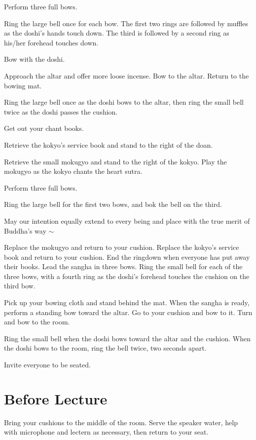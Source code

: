 \documentclass{kdo}
\begin{document}
\begin{services}
\doshi Perform three full bows.

\doan Ring the large bell once for each bow. The first two rings are followed
by muffles as the doshi's hands touch down. The third is followed by a second
ring as his/her forehead touches down.
\firstBows

\sangha Bow with the doshi.

\doshi Approach the altar and offer more loose incense. Bow to the altar.
Return to the bowing mat.

\doan Ring the large bell once as the doshi bows to the altar, then ring the
small bell twice as the doshi passes the cushion.
\takeOutChantBookBells

\sangha Get out your chant books.

\kokyo Retrieve the kokyo's service book and stand to the right of the doan.

\tenken Retrieve the small mokugyo and stand to the right of the kokyo. Play the
mokugyo as the kokyo chants the heart sutra.

\doshi Perform three full bows.

\doan Ring the large bell for the first two bows, and bok the bell on the
third.
\secondBows

\kokyo \heartOfGreatPerfectWisdomSutra

\kokyo May our intention equally extend to every being and place with the true
merit of Buddha's way $\sim$ \largebell

\allBuddhas*

\smallBellRolldown

\tenken Replace the mokugyo and return to your cushion.
\kokyo Replace the kokyo's service book and return to your cushion.
\doan End the ringdown when everyone has put away their books.
\doshi Lead the sangha in three bows.
\doan Ring the small bell for each of the three bows, with a fourth ring as the
doshi's forehead touches the cushion on the third bow.
\lastBows

\doshi Pick up your bowing cloth and stand behind the mat. When the sangha is
ready, perform a standing bow toward the altar. Go to your cushion and bow to
it. Turn and bow to the room.

\doan Ring the small bell when the doshi bows toward the altar and the cushion.
When the doshi bows to the room, ring the bell twice, two seconds apart.
\beSeatedBells

\doshi Invite everyone to be seated.

\section*{Before Lecture}
\sangha Bring your cushions to the middle of the room.
\kokyo Serve the speaker water, help with microphone and lectern as necessary,
then return to your seat.


\end{services}
\end{document}
